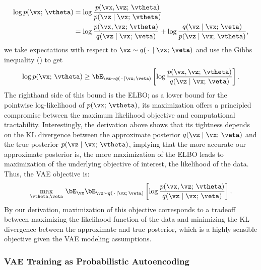\documentclass[../../book-main.tex]{subfiles}
\begin{document}
\begin{align*}
\log p(\vx;\, \vtheta) &=
\log \frac{p(\vx, \vz;\, \vtheta)}{p(\vz \mid \vx;\, \vtheta)}
\\
&=
\log \frac{p(\vx, \vz;\, \vtheta)}{q(\vz \mid \vx;\, \veta)}
+
\log \frac{q(\vz \mid \vx;\, \veta)}{p(\vz \mid \vx;\, \vtheta)},
\end{align*}
we take expectations with respect to $\vz \sim q(\,\cdot\, \mid
\vx;\, \veta)$ and
use the Gibbs inequality () to get
\begin{equation*}
\log p(\vx;\, \vtheta)
\geq
\bE_{\vz \sim q(\,\cdot\, \mid \vx ;\, \veta)} \left[
  \log \frac{p(\vx, \vz;\, \vtheta)}{q(\vz \mid \vx;\, \veta)}
\right].
\end{equation*}
The righthand side of this bound is the ELBO; as a lower bound for the pointwise
log-likelihood of $p(\vx;\, \vtheta)$, its maximization offers a
principled compromise
between the maximum likelihood objective and computational tractability.
Interestingly, the derivation above shows that its tightness depends on the KL
divergence between the approximate posterior $q(\vz \mid \vx;\, \veta)$ and the
true posterior $p(\vz \mid \vx;\, \vtheta)$, implying that the more accurate our
approximate posterior is, the more maximization of the ELBO leads to
maximization of the underlying objective of interest, the likelihood of the
data. Thus, the VAE objective is:
\begin{equation}\label{eq:elbo-objective}
\max_{\vtheta, \veta}\,
\bE_{\vx}
\bE_{\vz \sim q(\,\cdot\, \mid \vx ;\, \veta)} \left[
  \log \frac{p(\vx, \vz;\, \vtheta)}{q(\vz \mid \vx;\, \veta)}
\right].
\end{equation}
By our derivation, maximization of this objective corresponds to a tradeoff
between maximizing the likelihood function of the data and minimizing the KL
divergence between the approximate and true posterior, which is a highly
sensible objective given the VAE modeling assumptions.

\subsubsection{VAE Training as Probabilistic Autoencoding}
\end{document}
